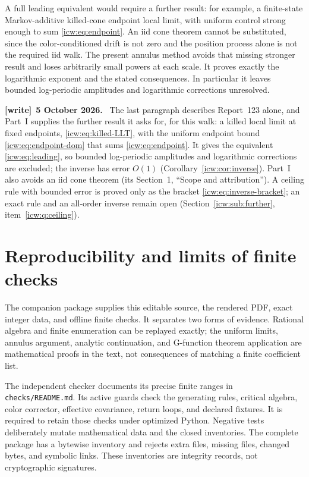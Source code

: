 \documentclass[11pt,letterpaper]{article}
\theoremstyle{remark}\newtheorem{remark}[theorem]{Remark}
\newcommand{\1}{\mathbf1}
\newenvironment{writenote}[1][]{\par\smallskip\begingroup\small
 \noindent\textbf{[write]}\if\relax\detokenize{#1}\relax\else~\textbf{#1.}\fi\ }%
 {\par\endgroup\smallskip}
\begin{document}
A full leading equivalent would require a further result: for example,
a finite-state Markov-additive killed-cone endpoint local limit, with
uniform control strong enough to sum \eqref{icw:eq:endpoint}. An iid cone
theorem cannot be substituted, since the color-conditioned drift is not
zero and the position process alone is not the required iid walk.
The present annulus method avoids that missing stronger result and loses
arbitrarily small powers at each scale. It proves exactly the logarithmic
exponent and the stated consequences. In particular it leaves bounded
log-periodic amplitudes and logarithmic corrections unresolved.
\begin{writenote}[5 October 2026]
The last paragraph describes Report~123 alone, and Part~I supplies the further result it asks for, for this walk: a killed local limit at fixed endpoints, \eqref{icw:eq:killed-LLT}, with the uniform endpoint bound \eqref{icw:eq:endpoint-dom} that sums \eqref{icw:eq:endpoint}. It gives the equivalent \eqref{icw:eq:leading}, so bounded log-periodic amplitudes and logarithmic corrections are excluded; the inverse has error $O(1)$ (Corollary~\ref{icw:cor:inverse}). Part~I also avoids an iid cone theorem (its Section~1, ``Scope and attribution''). A ceiling rule with bounded error is proved only as the bracket \eqref{icw:eq:inverse-bracket}; an exact rule and an all-order inverse remain open (Section~\ref{icw:sub:further}, item~\ref{icw:q:ceiling}).
\end{writenote}

\section{Reproducibility and limits of finite checks}\label{icw:log:sec:repro}
The companion package supplies this editable source, the rendered PDF,
exact integer data, and offline finite checks. It separates two forms of
evidence. Rational algebra and finite enumeration can be replayed exactly;
the uniform limits, annulus argument, analytic continuation, and
G-function theorem application are mathematical proofs in the text,
not consequences of matching a finite coefficient list.

The independent checker documents its precise finite ranges in
\texttt{checks/README.md}. Its active guards check the generating rules,
critical algebra, color corrector, effective covariance, return loops,
and declared fixtures. It is required to retain those checks under
optimized Python. Negative tests deliberately mutate mathematical data
and the closed inventories. The complete package has a bytewise inventory
and rejects extra files, missing files, changed bytes, and symbolic links.
These inventories are integrity records, not cryptographic signatures.
\end{document}
